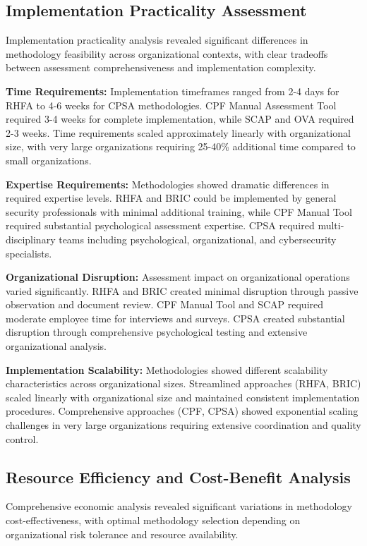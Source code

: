 \documentclass[10pt, twocolumn]{article}
\begin{document}
\subsection{Implementation Practicality Assessment}

Implementation practicality analysis revealed significant differences in methodology feasibility across organizational contexts, with clear tradeoffs between assessment comprehensiveness and implementation complexity.

\textbf{Time Requirements:} Implementation timeframes ranged from 2-4 days for RHFA to 4-6 weeks for CPSA methodologies. CPF Manual Assessment Tool required 3-4 weeks for complete implementation, while SCAP and OVA required 2-3 weeks. Time requirements scaled approximately linearly with organizational size, with very large organizations requiring 25-40\% additional time compared to small organizations.

\textbf{Expertise Requirements:} Methodologies showed dramatic differences in required expertise levels. RHFA and BRIC could be implemented by general security professionals with minimal additional training, while CPF Manual Tool required substantial psychological assessment expertise. CPSA required multi-disciplinary teams including psychological, organizational, and cybersecurity specialists.

\textbf{Organizational Disruption:} Assessment impact on organizational operations varied significantly. RHFA and BRIC created minimal disruption through passive observation and document review. CPF Manual Tool and SCAP required moderate employee time for interviews and surveys. CPSA created substantial disruption through comprehensive psychological testing and extensive organizational analysis.

\textbf{Implementation Scalability:} Methodologies showed different scalability characteristics across organizational sizes. Streamlined approaches (RHFA, BRIC) scaled linearly with organizational size and maintained consistent implementation procedures. Comprehensive approaches (CPF, CPSA) showed exponential scaling challenges in very large organizations requiring extensive coordination and quality control.

\subsection{Resource Efficiency and Cost-Benefit Analysis}

Comprehensive economic analysis revealed significant variations in methodology cost-effectiveness, with optimal methodology selection depending on organizational risk tolerance and resource availability.
\end{document}
